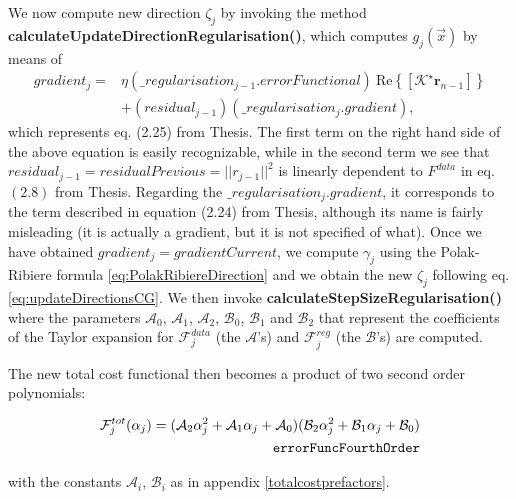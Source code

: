 \documentclass[10pt,a4paper]{article}
\newcommand{\real}[1]{\text{Re} \left\{ #1 \right\}}
\begin{document}
{{
We now compute new direction $\zeta_j$ by invoking the method \textbf{calculateUpdateDirectionRegularisation()}, which computes $g_j(\vec{x})$ by means of
\begin{align}
gradient_j =& \eta  (\_regularisation_{j-1}.errorFunctional) \ \real{[\mathcal{K}^\star\mathbf{r}_{n-1}]} \\
 &+ (residual_{j-1})( \_regularisation_j.gradient),
\end{align}
which represents eq. (2.25) from Thesis. 
The first term on the right hand side of the above equation is easily recognizable, while in the second term we see that $residual_{j-1} = residualPrevious = ||r_{j-1}||^2$ is linearly dependent to $F ^{data}$ in eq. $(2.8)$ from Thesis. 
Regarding the $ \_regularisation_j.gradient$, it corresponds to the term described in equation (2.24) from Thesis, although its name is fairly misleading (it is actually a gradient, but it is not specified of what).
\newline
Once we have obtained $gradient_j= gradientCurrent$, we compute $\gamma_j$ using the Polak-Ribiere formula \eqref{eq:PolakRibiereDirection} and we obtain the new $\zeta_j$ following eq. \eqref{eq:updateDirectionsCG}.
}
\newline
{
We then invoke \textbf{calculateStepSizeRegularisation()} where the parameters $\mathcal{A}_0$, $\mathcal{A}_1$, $\mathcal{A}_2$, $\mathcal{B}_0$, $\mathcal{B}_1$ and $\mathcal{B}_2$ that represent the coefficients of the Taylor expansion for $\mathcal{F}^{data}_j$ (the $\mathcal{A}$'s) and $\mathcal{F}^{reg}_j$ (the $\mathcal{B}$'s) are computed.
}

The new total cost functional then becomes a product of two second order polynomials:

\begin{align} \label{eq:errorFuncFourthOrder} \mathcal{F}^{tot}_{{j}} {(\alpha_j)} =
(\mathcal{A}_2\alpha^{2}_{{j}} + \mathcal{A}_1\alpha_{{j}}
+\mathcal{A}_0)(\mathcal{B}_2\alpha^{2}_{{j}} + \mathcal{B}_1\alpha_{{j}} +
\mathcal{B}_0)\\
\tag*{\texttt{errorFuncFourthOrder}}
\end{align}

with the constants $\mathcal{A}_i$, $\mathcal{B}_i$ as in appendix \ref{totalcostprefactors}.

}
\end{document}
